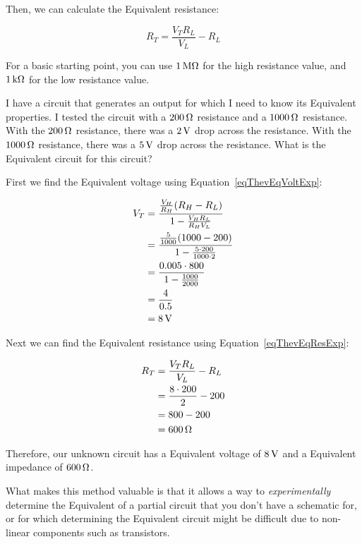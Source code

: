 Then, we can calculate the \thev Equivalent resistance:

\begin{equation}
\label{eqThevEqResExp}
R_T = \frac{V_T R_L}{V_L} - R_L
\end{equation}

For a basic starting point, you can use $1\,\si{\mega\ohm}$ for the high resistance value, and $1\,\si{\kilo\ohm}$ for the low resistance value.

\begin{exampleprob}
I have a circuit that generates an output for which I need to know its \thev Equivalent properties.
I tested the circuit with a $200\,\si{\ohm}$ resistance and a $1000\,\si{\ohm}$ resistance.
With the $200\,\si{\ohm}$ resistance, there was a $2\,\si{\volt}$ drop across the resistance.
With the $1000\,\si{\ohm}$ resistance, there was a $5\,\si{\volt}$ drop across the resistance.
What is the \thev Equivalent circuit for this circuit?

First we find the \thev Equivalent voltage using Equation~\ref{eqThevEqVoltExp}:

\begin{align*}
V_T &= \frac{\frac{V_H}{R_H}(R_H - R_L)}{1 - \frac{V_H R_L}{R_H V_L}} \\
    &= \frac{\frac{5}{1000}(1000 - 200)}{1 - \frac{5\cdot 200}{1000\cdot 2}} \\
    &= \frac{0.005\cdot800}{1 - \frac{1000}{2000}} \\
    &= \frac{4}{0.5} \\
    &= 8\,\si{\volt}
\end{align*}

Next we can find the \thev Equivalent resistance using Equation~\ref{eqThevEqResExp}:

\begin{align*}
R_T &= \frac{V_T R_L}{V_L} - R_L \\
    &= \frac{8\cdot 200}{2} - 200 \\
    &= 800 - 200 \\
    &= 600\,\si{\ohm}
\end{align*}

Therefore, our unknown circuit has a \thev Equivalent voltage of $8\,\si{\volt}$ and a \thev Equivalent impedance of $600\,\si{\ohm}$.
\end{exampleprob}

What makes this method valuable is that it allows a way to \emph{experimentally} determine the \thev Equivalent of a partial circuit that you don't have a schematic for, or for which determining the \thev Equivalent circuit might be difficult due to non-linear components such as transistors.

